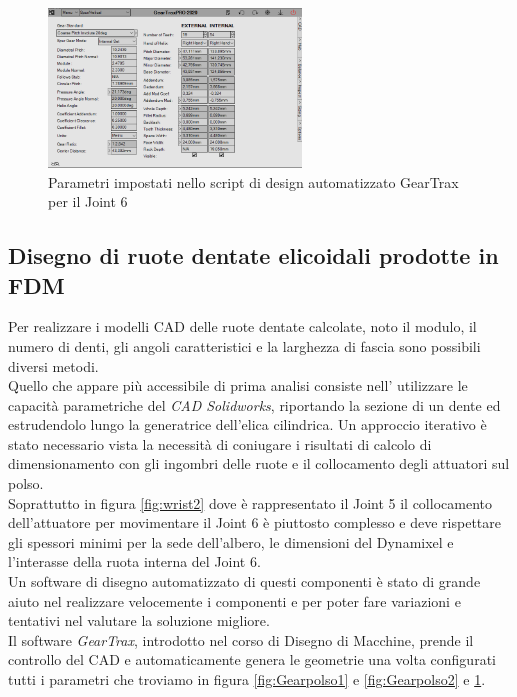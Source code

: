 \documentclass[%
corpo=11pt,
twoside,
 stile=classica,
oldstyle,
greek,%
]{toptesi}
\begin{document}
	\begin{figure} [H]
		\centering
		\includegraphics[width=0.6\textwidth]{Plots/POLSO3/gear_polso3.png}
		\caption{Parametri impostati nello script di design automatizzato GearTrax per il Joint 6}
		\label{fig:Gearpolso3}
	\end{figure} 

	
		\subsection{Disegno di ruote dentate elicoidali prodotte in FDM}
		Per realizzare i modelli CAD delle ruote dentate calcolate, noto il modulo, il numero di denti, gli angoli caratteristici e la larghezza di fascia sono possibili diversi metodi.\\ 
		Quello che appare più accessibile di prima analisi consiste nell' utilizzare le capacità parametriche del \textit{ CAD Solidworks}, riportando la sezione di un dente ed estrudendolo lungo la generatrice dell'elica cilindrica. 
		Un approccio iterativo è stato necessario vista la necessità di coniugare i risultati di calcolo di dimensionamento con gli ingombri delle ruote e il collocamento degli attuatori sul polso.\\
		 Soprattutto in figura \ref{fig:wrist2} dove è rappresentato il Joint 5 il collocamento dell'attuatore per movimentare il Joint 6 è piuttosto complesso e deve rispettare gli spessori minimi per la sede dell'albero, le dimensioni del Dynamixel e l'interasse della ruota interna del Joint 6. \\
		Un software di disegno automatizzato di questi componenti è stato di grande aiuto nel realizzare velocemente i componenti e per poter fare variazioni e tentativi nel valutare la soluzione migliore. \\
		
		Il software \textit{GearTrax}, introdotto nel corso di Disegno di Macchine, prende il controllo del CAD e automaticamente genera le geometrie una volta configurati tutti i parametri che troviamo in figura \ref{fig:Gearpolso1} e \ref{fig:Gearpolso2} e \ref{fig:Gearpolso3}.
			
\end{document}
